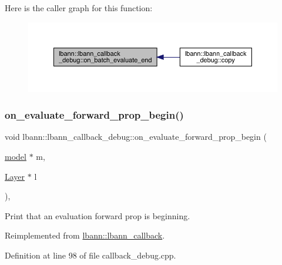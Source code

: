 Here is the caller graph for this function\+:\nopagebreak
\begin{figure}[H]
\begin{center}
\leavevmode
\includegraphics[width=350pt]{classlbann_1_1lbann__callback__debug_a07a02eb525ebe9c06b361c48fc2977c8_icgraph}
\end{center}
\end{figure}
\mbox{\label{classlbann_1_1lbann__callback__debug_a83fe16882119a54afe59ba616fe1722a}} 
\subsubsection{\texorpdfstring{on\+\_\+evaluate\+\_\+forward\+\_\+prop\+\_\+begin()}{on\_evaluate\_forward\_prop\_begin()}}
{\footnotesize\ttfamily void lbann\+::lbann\+\_\+callback\+\_\+debug\+::on\+\_\+evaluate\+\_\+forward\+\_\+prop\+\_\+begin (\begin{DoxyParamCaption}\item[{\hyperlink{classlbann_1_1model}{model} $\ast$}]{m,  }\item[{\hyperlink{classlbann_1_1Layer}{Layer} $\ast$}]{l }\end{DoxyParamCaption})\hspace{0.3cm}{\ttfamily [override]}, {\ttfamily [virtual]}}

Print that an evaluation forward prop is beginning. 

Reimplemented from \hyperlink{classlbann_1_1lbann__callback_a044174864e4981a1dac093d58e8c4d6c}{lbann\+::lbann\+\_\+callback}.



Definition at line 98 of file callback\+\_\+debug.\+cpp.


